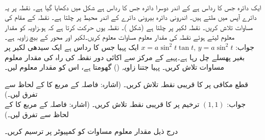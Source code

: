 \\
ایک دائرہ جس کا رداس  ہے کے اندر دوسرا دائرہ جس کا رداس  ہے شکل  میں دکھایا گیا ہے۔ نقطہ  پر یہ دائرے آپس میں ملتے ہیں۔ اندرونی دائرہ بیرونی دائرے کے اندر محیط پر چلتا ہے۔ نقطہ  کے مقام کی مساوات تلاش کریں۔
نقطہ  لکیر  پر چلتا ہے (شکل )۔ نقطہ  یوں حرکت کرتا ہے کہ  ہو۔زاویہ  کو مقدار معلوم لیتے ہوئے نقطہ  کی مقدار معلوم مساوات معلوم کریں۔لکیر  اور  محور کے بیچ زاویہ  ہے۔\\
جواب:\quad
$x=a\sin^2t\tan t,\, y=a\sin^2t$
ایک پہیا جس کا رداس  ہے ایک سیدھی لکیر پر بغیر پھسلے چل رہا ہے۔پہیے کے مرکز سے  اکائی دور نقطہ  کی راہ کی مقدار معلوم مساوات تلاش کریں۔ پہیا جتنا زاویہ () گھومتا ہے، اس کو مقدار معلوم لیں۔   


قطع مکافی  پر  کا قریبی نقطہ تلاش کریں۔ (اشارہ: فاصلہ کے مربع کا  کے لحاظ سے تفرق لیں۔)\\
جواب:\quad
$(1,1)$
ترخیم  پر  کا قریبی نقطہ تلاش کریں۔  (اشارہ: فاصلہ کے مربع کا  کے لحاظ سے تفرق لیں۔)


درج ذیل مقدار معلوم مساوات کو کمپیوٹر پر ترسیم کریں۔

